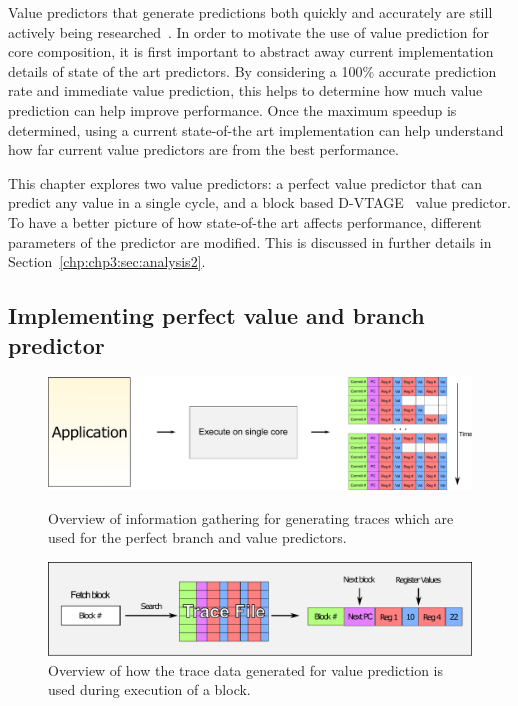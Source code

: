 Value predictors that generate predictions both quickly and accurately are still actively being researched~\cite{peraisVTAGE2014,peraisBeBop2015,sheikh2017value}.
In order to motivate the use of value prediction for core composition, it is first important to abstract away current implementation details of state of the art predictors.
By considering a 100\% accurate prediction rate and immediate value prediction, this helps to determine how much value prediction can help improve performance.
Once the maximum speedup is determined, using a current state-of-the art implementation can help understand how far current value predictors are from the best performance.

This chapter explores two value predictors: a perfect value predictor that can predict any value in a single cycle, and a block based D-VTAGE~\cite{peraisBeBop2015} value predictor.
To have a better picture of how state-of-the art affects performance, different parameters of the predictor are modified.
This is discussed in further details in Section~\ref{chp:chp3:sec:analysis2}.

\subsection{Implementing perfect value and branch predictor}

\begin{figure}[t]
    \centering
    \includegraphics[width=1\textwidth]{chapter3/graphics/trace-gen.pdf}

    \caption{Overview of information gathering for generating traces which are used for the perfect branch and value predictors.}
    \label{fig:trace-gen}

    \centering
    \includegraphics[width=1\textwidth]{chapter3/graphics/fetching-trace.pdf}

    \caption{Overview of how the trace data generated for value prediction is used during execution of a block.}
    \label{fig:trace-used}
	\vspace{1em}
\end{figure}

